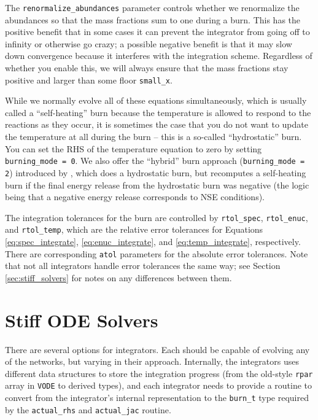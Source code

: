 The \texttt{renormalize\_abundances} parameter controls whether we renormalize
the abundances so that the mass fractions sum to one during a burn. This
has the positive benefit that in some cases it can prevent the integrator
from going off to infinity or otherwise go crazy; a possible negative benefit
is that it may slow down convergence because it interferes with the integration
scheme. Regardless of whether you enable this, we will always ensure that the
mass fractions stay positive and larger than some floor \texttt{small\_x}.

While we normally evolve all of these equations simultaneously, which is
usually called a ``self-heating'' burn because the temperature is allowed
to respond to the reactions as they occur, it is
sometimes the case that you do not want to update the temperature at all
during the burn -- this is a so-called ``hydrostatic'' burn. You can
set the RHS of the temperature equation to zero by setting
\texttt{burning\_mode = 0}. We also offer the ``hybrid'' burn approach
(\texttt{burning\_mode = 2}) introduced by \cite{raskin:2010}, which
does a hydrostatic burn, but recomputes a self-heating burn if the
final energy release from the hydrostatic burn was negative (the
logic being that a negative energy release corresponds to NSE conditions).

The integration tolerances for the burn are controlled by \texttt{rtol\_spec},
\texttt{rtol\_enuc}, and \texttt{rtol\_temp}, which are the relative error
tolerances for Equations \ref{eq:spec_integrate}, \ref{eq:enuc_integrate},
and \ref{eq:temp_integrate}, respectively. There are corresponding \texttt{atol}
parameters for the absolute error tolerances. Note that not all integrators
handle error tolerances the same way; see Section \ref{sec:stiff_solvers} for
notes on any differences between them.

\section{Stiff ODE Solvers}
\label{ch:networks:integrators}

There are several options for integrators.  Each should be capable of 
evolving any of the networks, but varying in their approach.  Internally,
the integrators uses different data structures to store the integration
progress (from the old-style {\tt rpar} array in {\tt VODE} to derived
types), and each integrator needs to provide a routine to convert 
from the integrator's internal representation to the {\tt burn\_t}
type required by the {\tt actual\_rhs} and {\tt actual\_jac} routine.

